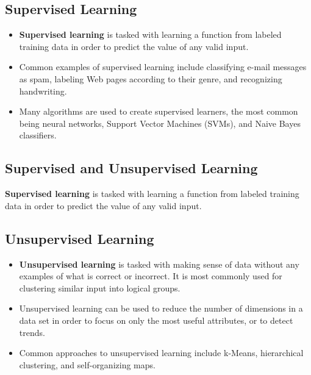\documentclass[]{report}
\begin{document}

\subsection*{Supervised Learning}
\begin{itemize}
\item \textbf{Supervised learning} is tasked with learning a function from labeled training data in order to predict the value of any valid input. 

\item Common examples of supervised learning include classifying e-mail messages as spam, labeling Web pages according to their genre, and recognizing handwriting. 
\item Many algorithms are used to create supervised learners, the most common being neural networks, Support Vector Machines (SVMs), and Naive Bayes classifiers.
\end{itemize}

\subsection*{Supervised and Unsupervised Learning}
\textbf{Supervised learning} is tasked with learning a function from labeled training data in order to predict the value of any valid input. 


\subsection*{Unsupervised Learning}
\begin{itemize}
	\item
\textbf{Unsupervised learning} is tasked with making sense of data without any examples of what is correct or incorrect. It is most commonly used for clustering similar input into logical groups. 
\item Unsupervised learning  can be used to reduce the number of dimensions in a data set in order to focus on only the most useful attributes, or to detect trends. 

\item Common approaches to unsupervised learning include k-Means, hierarchical clustering, and self-organizing maps.
\end{itemize}


\end{document}
